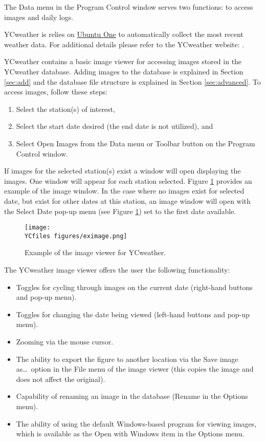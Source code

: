 \label{sec:data}
The Data menu in the Program Control window serves two functions: to access images and daily logs.

YCweather is relies on \href{https://one.ubuntu.com/dashboard/}{Ubuntu One} to automatically collect the most recent weather data. For additional details please refer to the YCweather website: .

 \label{sec:images}
YCweather contains a basic image viewer for accessing images stored in the YCweather database.  Adding images to the database is explained in Section \ref{sec:add} and the database file structure is explained in Section \ref{sec:advanced}.  To access images, follow these steps:
\begin{enumerate}
	\item Select the station(s) of interest,
	\item Select the start date desired (the end date is not utilized), and
	\item Select Open Images from the Data menu or Toolbar button on the Program Control window.
\end{enumerate}

If images for the selected station(s) exist a window will open displaying the images. One window will appear for each station selected.  Figure \ref{fig:eximage} provides an example of the image window.  In the case where no images exist for selected date, but exist for other dates at this station, an image window will open with the Select Date pop-up menu (see Figure \ref{fig:eximage}) set to the first date available.  

\begin{figure}[ht!]\centering
	\texttt{[image: \\YCfiles figures/eximage.png]}
	\caption{Example of the image viewer for YCweather.}
	\label{fig:eximage}
\end{figure}

The YCweather image viewer offers the user the following functionality:
\begin{itemize}
     \item Toggles for cycling through images on the current date (right-hand buttons and pop-up menu).
     \item Toggles for changing the date being viewed (left-hand buttons and pop-up menu).
     \item Zooming via the mouse cursor.
     \item The ability to export the figure to another location via the Save image as\ldots ~option in the File menu of the image viewer (this copies the image and does not affect the original).
     \item Capability of renaming an image in the database (Rename in the Options menu).
     \item The ability of using the default Windows-based program for viewing images, which is available as the Open with Windows item in the Options menu. 
\end{itemize}

